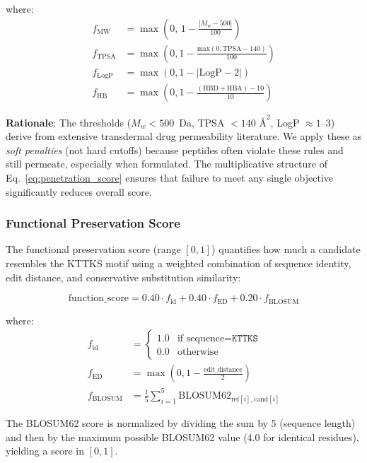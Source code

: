 \documentclass[11pt,letterpaper]{article}
\begin{document}
where:
\begin{align}
f_{\text{MW}} &= \max\!\left(0,\, 1 - \frac{|M_w - 500|}{100}\right) \\
f_{\text{TPSA}} &= \max(0, 1 - \frac{\text{max}(0, \text{TPSA} - 140)}{100}) \\
f_{\text{LogP}} &= \max(0, 1 - |\text{LogP} - 2|) \\
f_{\text{HB}} &= \max(0, 1 - \frac{(\text{HBD} + \text{HBA}) - 10}{10})
\end{align}

\textbf{Rationale}: The thresholds ($M_w < 500$~Da, TPSA $< 140$ $\text{\AA}^2$, LogP $\approx 1$--$3$) derive from extensive transdermal drug permeability literature\cite{potts1992, prausnitz2004}. We apply these as \textit{soft penalties} (not hard cutoffs) because peptides often violate these rules and still permeate, especially when formulated. The multiplicative structure of Eq.~\ref{eq:penetration_score} ensures that failure to meet any single objective significantly reduces overall score.

\subsubsection{Functional Preservation Score}

The functional preservation score (range $[0, 1]$) quantifies how much a candidate resembles the KTTKS motif using a weighted combination of sequence identity, edit distance, and conservative substitution similarity:

\begin{equation}
\text{function\_score} = 0.40 \cdot f_{\text{id}} + 0.40 \cdot f_{\text{ED}} + 0.20 \cdot f_{\text{BLOSUM}}
\label{eq:function_score}
\end{equation}

where:
\begin{align}
f_{\text{id}} &= \begin{cases} 1.0 & \text{if sequence} = \texttt{KTTKS} \\ 0.0 & \text{otherwise} \end{cases} \\
f_{\text{ED}} &= \max(0, 1 - \frac{\text{edit\_distance}}{2}) \\
f_{\text{BLOSUM}} &= \frac{1}{5} \sum_{i=1}^{5} \text{BLOSUM62}_{\text{ref}[i], \text{cand}[i]}
\end{align}

The BLOSUM62 score is normalized by dividing the sum by 5 (sequence length) and then by the maximum possible BLOSUM62 value (4.0 for identical residues), yielding a score in $[0, 1]$.
\end{document}
